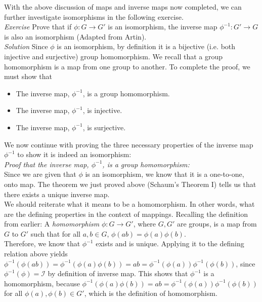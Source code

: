 With the above discussion of maps and inverse maps now completed, we can further investigate isomorphisms in the following exercise.\\

\textit{Exercise} Prove that if $\phi: G \rightarrow G'$ is an isomorphism, the inverse map $\phi^{-1}: G' \rightarrow G$ is also an isomorphism (Adapted from Artin).\\

\textit{Solution}  Since $\phi$ is an isomorphism, by definition it is a bijective (i.e. both injective and surjective) group homomorphism.  We recall that a group homomorphism is a map from one group to another.  To complete the proof, we must show that 

\begin{itemize}
\item The inverse map, $\phi^{-1}$, is a group homomorphism.
\item The inverse map, $\phi^{-1}$, is injective.
\item The inverse map, $\phi^{-1}$, is surjective.

\end{itemize}

We now continue with proving the three necessary properties of the inverse map $\phi^{-1}$ to show it is indeed an isomorphism:\\

\textit{Proof that the inverse map, $\phi^{-1}$, is a group homomorphism:}\\

Since we are given that $\phi$ is an isomorphism, we know that it is a one-to-one, onto map.  The theorem we just proved above (Schaum's Theorem I) tells us that there exists a unique inverse map.\\

We should reiterate what it means to be a homomorphism.  In other words, what are the defining properties in the context of mappings.  Recalling the definition from earlier: A \textit{homomorphism} $\phi: G \rightarrow G'$, where $G,G'$ are groups, is a map from $G$ to $G'$ such that for all $a,b \in G$, $\phi(ab)=\phi(a)\phi(b)$.\\

Therefore, we know that $\phi^{-1}$ exists and is unique.  Applying it to the defining relation above yields $\phi^{-1}(\phi(ab))=\phi^{-1}(\phi(a)\phi(b))=ab=\phi^{-1}(\phi(a))\phi^{-1}(\phi(b))$, since $\phi^{-1}(\phi)=\mathcal{I}$ by definition of inverse map.  This shows that $\phi^{-1}$ is a homomorphism, because $\phi^{-1}(\phi(a)\phi(b))=ab=\phi^{-1}(\phi(a))\phi^{-1}(\phi(b))$ for all $\phi(a), \phi(b) \in G'$, which is the definition of homomorphism.\\

